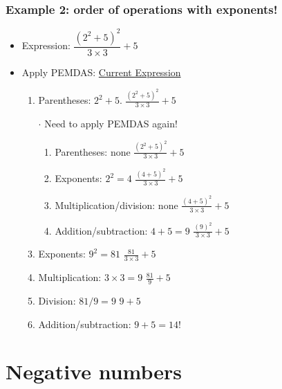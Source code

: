 \documentclass[12pt]{beamer}
\newcommand{\myframe}[1]{\begin{frame} \frametitle{#1}}
\begin{document}
\myframe{Example 2: order of operations with exponents!}
\begin{itemize}
\item Expression: $\dfrac{(2^2 + 5)^2}{3\times 3} + 5$
\item[]
\item Apply PEMDAS: \hfill \underline{Current Expression}
\begin{enumerate}
\item Parentheses: $2^2 + 5$. \hfill $\frac{(2^2 + 5)^2}{3\times 3} + 5$
\item[$\cdot$] Need to apply PEMDAS again!
\begin{enumerate}
\item Parentheses: none \hfill $\frac{(2^2 + 5)^2}{3\times 3} + 5$
\item Exponents: $2^2 = 4$ \hfill $\frac{(4 + 5)^2}{3\times 3} + 5$
\item Multiplication/division: none \hfill $\frac{(4 + 5)^2}{3\times 3} + 5$
\item Addition/subtraction: $4 + 5 = 9$ \hfill $\frac{(9)^2}{3\times 3} + 5$
\end{enumerate}
\item Exponents: $9^2 = 81$ \hfill $\frac{81}{3\times 3} + 5$
\item Multiplication: $3 \times 3 = 9$ \hfill $\frac{81}{9} + 5$
\item Division: $81/9 = 9$ \hfill $9 + 5$
\item Addition/subtraction: $9 + 5 = 14$!
\end{enumerate}
\end{itemize}
\end{frame}

\section{Negative numbers}
\end{document}
